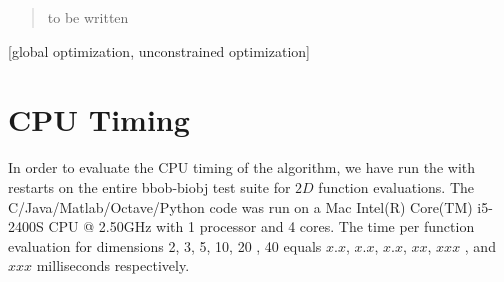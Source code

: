 \documentclass{sig-alternate}
\newcommand{\change}[1]{{\color{red} #1}}
\begin{document}

\maketitle
\begin{abstract}
to be written
\end{abstract}

[global optimization,
unconstrained optimization]



%
%
%
\section{CPU Timing}
In order to evaluate the CPU timing of the algorithm, we have run the \change{\algname} with restarts on the entire bbob-biobj test suite for $2 D$ function evaluations. The \change{C/Java/Matlab/Octave/Python} code was run on a \change{Mac Intel(R) Core(TM) i5-2400S CPU @ 2.50GHz} with \change{1} processor and \change{4} cores. The time per function evaluation for dimensions 2, 3, 5, 10, 20\change{, 40} equals \change{$x.x$}, \change{$x.x$}, \change{$x.x$}, \change{$xx$}, \change{$xxx$}\change{, and $xxx$} milliseconds respectively. 
\end{document}
